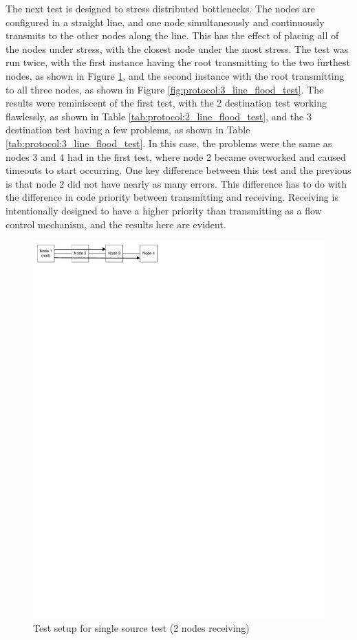 The next test is designed to stress distributed bottlenecks. The nodes are configured in a straight line, and one node simultaneously and continuously transmits to the other nodes along the line. This has the effect of placing all of the nodes under stress, with the closest node under the most stress. The test was run twice, with the first instance having the root transmitting to the two furthest nodes, as shown in Figure \ref{fig:protocol:2_line_flood_test}, and the second instance with the root transmitting to all three nodes, as shown in Figure \ref{fig:protocol:3_line_flood_test}. The results were reminiscent of the first test, with the 2 destination test working flawlessly, as shown in Table \ref{tab:protocol:2_line_flood_test}, and the 3 destination test having a few problems, as shown in Table \ref{tab:protocol:3_line_flood_test}. In this case, the problems were the same as nodes 3 and 4 had in the first test, where node 2 became overworked and caused timeouts to start occurring. One key difference between this test and the previous is that node 2 did not have nearly as many errors. This difference has to do with the difference in code priority between transmitting and receiving. Receiving is intentionally designed to have a higher priority than transmitting as a flow control mechanism, and the results here are evident.

\begin{figure}[ptb]
	\begin{centering}
		\includegraphics{Protocol/Figures/protocol-2_line_flood_test.pdf}
		\caption{Test setup for single source test (2 nodes receiving)}
		\label{fig:protocol:2_line_flood_test}
	\end{centering}
\end{figure}

